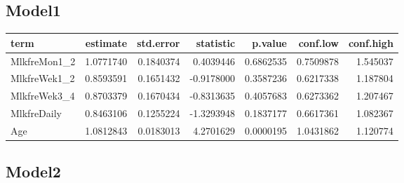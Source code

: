 \documentclass[]{article}
\newenvironment{Shaded}{\begin{snugshade}}{\end{snugshade}}
\newcommand{\DataTypeTok}[1]{\textcolor[rgb]{0.13,0.29,0.53}{#1}}
\newcommand{\KeywordTok}[1]{\textcolor[rgb]{0.13,0.29,0.53}{\textbf{#1}}}
\newcommand{\NormalTok}[1]{#1}
\newcommand{\OperatorTok}[1]{\textcolor[rgb]{0.81,0.36,0.00}{\textbf{#1}}}
\newcommand{\OtherTok}[1]{\textcolor[rgb]{0.56,0.35,0.01}{#1}}
\newcommand{\StringTok}[1]{\textcolor[rgb]{0.31,0.60,0.02}{#1}}
\begin{document}
\hypertarget{model1-2}{%
\subsection{Model1}\label{model1-2}}

\begin{Shaded}
\end{Shaded}

\begin{longtable}[]{@{}lrrrrrr@{}}
\toprule
term & estimate & std.error & statistic & p.value & conf.low &
conf.high\tabularnewline
\midrule
\endhead
MlkfreMon1\_2 & 1.0771740 & 0.1840374 & 0.4039446 & 0.6862535 &
0.7509878 & 1.545037\tabularnewline
MlkfreWek1\_2 & 0.8593591 & 0.1651432 & -0.9178000 & 0.3587236 &
0.6217338 & 1.187804\tabularnewline
MlkfreWek3\_4 & 0.8703379 & 0.1670434 & -0.8313635 & 0.4057683 &
0.6273362 & 1.207467\tabularnewline
MlkfreDaily & 0.8463106 & 0.1255224 & -1.3293948 & 0.1837177 & 0.6617361
& 1.082367\tabularnewline
Age & 1.0812843 & 0.0183013 & 4.2701629 & 0.0000195 & 1.0431862 &
1.120774\tabularnewline
\bottomrule
\end{longtable}

\hypertarget{model2-2}{%
\subsection{Model2}\label{model2-2}}
\end{document}
